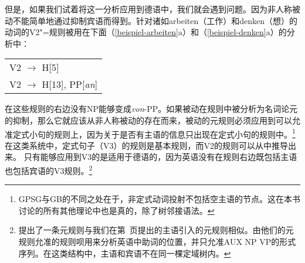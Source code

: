 但是，如果我们试着将这一分析应用到德语中，我们就会遇到问题。因为非人称被动不能简单地通过抑制宾语而得到。针对诸如arbeiten（工作）和denken（想）的动词的V2"=规则被用在下面（\ref{beispiel-arbeiten}a）和（\ref{beispiel-denken}a）的分析中：
\ea
\begin{tabular}[t]{@{}l@{}}
V2 $\to$ H[5]\\
V2 $\to$ H[13], PP[\emph{an}]\\
\end{tabular}
\z
在这些规则的右边没有NP能够变成\emph{von}-PP。如果被动在规则中被分析为名词论元的抑制，那么它就应该从非人称被动的存在而来，被动的元规则必须应用到可以允准定式小句的规则上，因为关于是否有主语的信息只出现在定式小句的规则中。\footnote{
GPSG与GB\indexgb 的不同之处在于，非定式动词投射不包括空主语的节点。这在本书讨论的所有其他理论中也是真的，除了树邻接语法\indextag 。
}在这类系统中，定式句子（V3）的规则是基本规则，而V2的规则可以从中推导出来。
只有能够应用到V3的是适用于德语的，因为英语没有在规则右边既包括主语也包括宾语的V3规则。\footnote{
\citet[]{GKPS85a}提出了一条元规则与我们在第~\pageref{subjekt-meta}页提出的主语引入的元规则相似。由他们的元规则允准的规则呗用来分析英语中助词的位置，并只允准AUX NP VP的形式序列。在这类结构中，主语和宾语不在同一棵定域树内。
}
